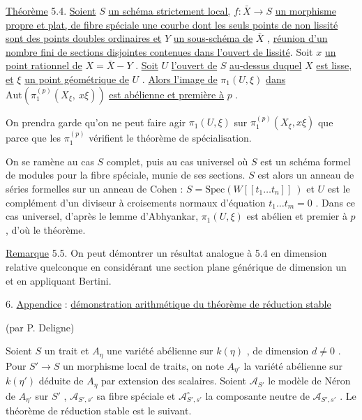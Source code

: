 
\underline{Théorème} 5.4. \underline{Soient} $S$ \underline{un schéma strictement local,} $f : \bar{X} \longrightarrow S$ \underline{un morphisme propre et plat, de fibre spéciale une courbe dont les seuls points de non lissité sont des points doubles ordinaires et} $Y$ \underline{un sous-schéma de} $\bar{X}$ , \underline{réunion d'un nombre fini de sections disjointes contenues dans l'ouvert de lissité}. Soit $x$ \underline{un point rationnel de} $X = \bar{X} - Y$ . \underline{Soit} $U$ \underline{l'ouvert de} $S$ \underline{au-dessus duquel} $X$ \underline{est lisse, et} $\xi$ \underline{un point géométrique de} $U$ . \underline{Alors l'image de} $\pi_1(U,\xi)$ \underline{dans} $\mathrm{Aut}(\pi_1^{(p)}(X_\xi,\ x\xi))$ \underline{est abélienne et première à} $p$ .

On prendra garde qu'on ne peut faire agir $\pi_1(U,\xi)$ sur $\pi_1^{(p)}(X_\xi,x\xi)$ que parce que les $\pi_1^{(p)}$ vérifient le théorème de spécialisation.

On se ramène au cas $S$ complet, puis au cas universel où $S$ est un schéma formel de modules pour la fibre spéciale, munie de ses sections. $S$ est alors un anneau de séries formelles sur un anneau de Cohen : $S = \mathrm{Spec}(W[[t_1 \ldots t_n]]\ )$ et $U$ est le complément d'un diviseur à croisements normaux d'équation $t_1 \ldots t_m = 0$ . Dans ce cas universel, d'après le lemme d'Abhyankar, $\pi_1(U,\xi)$ est abélien et premier à $p$ , d'où le théorème.

\underline{Remarque} 5.5. On peut démontrer un résultat analogue à 5.4 en dimension relative quelconque en considérant une section plane générique de dimension un et en appliquant Bertini.


6. \underline{Appendice} : \underline{démonstration arithmétique du théorème de réduction stable}

(par P. Deligne)

Soient $S$ un trait et $A_\eta$ une variété abélienne sur $k(\eta)$ , de dimension $d \neq 0$ . Pour $S' \longrightarrow S$ un morphisme local de traits, on note $A_{\eta'}$ la variété abélienne sur $k(\eta')$ déduite de $A_\eta$ par extension des scalaires. Soient $\mathcal{A}_{S'}$ le modèle de Néron de $A_{\eta'}$ sur $S'$ , $\mathcal{A}_{S',s'}$ sa fibre spéciale et $\mathcal{A}^{\circ}_{S',s'}$ la composante neutre de $\mathcal{A}_{S',s'}$ . Le théorème de réduction stable est le suivant.


